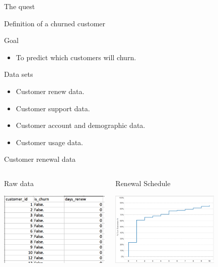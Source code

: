 \documentclass[10pt]{beamer}
\begin{document}
      \begin{frame}{The quest}
        \begin{block}{Definition of a churned customer}
        \end{block}
        \pause
        \begin{block}{Goal}
            \begin{itemize}
              \item To predict which customers will churn.
            \end{itemize}
        \end{block}
        \pause
        \begin{block}{Data sets}
          \begin{itemize}
            \item Customer renew data.
            \item Customer support data.
            \item Customer account and demographic data.
            \item Customer usage data.
          \end{itemize}
        \end{block}
      \end{frame}

    \begin{frame}{Customer renewal data}
        \begin{columns}[c]
          \begin{block}{Raw data}
            \begin{center}
              \includegraphics[height=100pt]{../graphs/dataset_customer_renew}
            \end{center}
          \end{block}
          \begin{block}{Renewal Schedule}
            \begin{center}
              \includegraphics[height=100pt]{../graphs/dataset_renewal_schedule}
            \end{center}
          \end{block}
        \end{columns}
    \end{frame}
\end{document}
